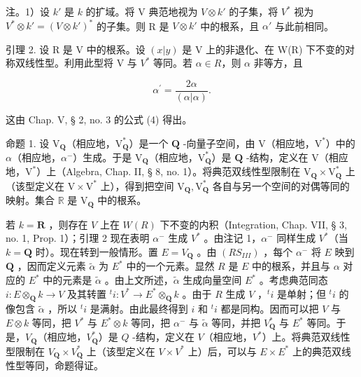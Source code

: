注。1）设 \(k'\) 是 \(k\) 的扩域。将 V 典范地视为 \(V \otimes k'\) 的子集，将 \(V^*\) 视为 \(V^* \otimes k' = (V \otimes k')^*\) 的子集。则 R 是 \(V \otimes k'\) 中的根系，且 \(\alpha'\) 与此前相同。

引理 2. 设 R 是 V 中的根系。设 \((x|y)\) 是 V 上的非退化、在 W(R) 下不变的对称双线性型。利用此型将 V 与 \(V^{*}\) 等同。若 \(\alpha \in R\)，则 \(\alpha\) 非等方，且

\[
\alpha^ {\prime} = \frac {2 \alpha}{(\alpha | \alpha)}.
\]

这由 Chap. V, § 2, no. 3 的公式 (4) 得出。

命题 1. 设 \(\mathrm{V}_{\mathbf{Q}}\)（相应地，\(\mathrm{V}_{\mathbf{Q}}^{*}\)）是一个 \(\mathbf{Q}\) -向量子空间，由 \(\mathrm{V}\)（相应地，\(\mathrm{V}^{*}\)）中的 \(\alpha\)（相应地，\(\alpha^{-}\)）生成。于是 \(\mathrm{V}_{\mathbf{Q}}\)（相应地，\(\mathrm{V}_{\mathbf{Q}}^{*}\)）是 \(\mathbf{Q}\) -结构，定义在 \(\mathrm{V}\)（相应地，\(\mathrm{V}^{*}\)）上（Algebra, Chap. II, § 8, no. 1）。将典范双线性型限制在 \(\mathrm{V}_{\mathbf{Q}} \times \mathrm{V}_{\mathbf{Q}}^{*}\) 上（该型定义在 \(\mathrm{V} \times \mathrm{V}^{*}\) 上），得到把空间 \(\mathrm{V}_{\mathbf{Q}}, \mathrm{V}_{\mathbf{Q}}^{*}\) 各自与另一个空间的对偶等同的映射。集合 \(\mathbb{R}\) 是 \(\mathrm{V}_{\mathbf{Q}}\) 中的根系。

若 \(k = \mathbf{R}\) ，则存在 \(V\) 上在 \(W(R)\) 下不变的内积（Integration, Chap. VII, § 3, no. 1, Prop. 1）；引理 2 现在表明 \(\alpha^{-}\) 生成 \(V^{*}\) 。由注记 1，\(\alpha^{-}\) 同样生成 \(V^{*}\)（当 \(k = \mathbf{Q}\) 时）。现在转到一般情形。置 \(E = V_{\mathbf{Q}}\) 。由 \((RS_{III})\) ，每个 \(\alpha^{-}\) 将 \(E\) 映到 \(\mathbf{Q}\) ，因而定义元素 \(\tilde{\alpha}\) 为 \(E^{*}\) 中的一个元素。显然 \(R\) 是 \(E\) 中的根系，并且与 \(\alpha\) 对应的 \(E^{*}\) 中的元素是 \(\tilde{\alpha}\) 。由上文所述，\(\tilde{\alpha}\) 生成向量空间 \(E^{*}\) 。考虑典范同态 \(i: E \otimes_{\mathbf{Q}} k \to V\) 及其转置 \({}^{t}i: V^{*} \to E^{*} \otimes_{\mathbf{Q}} k\) 。由于 \(R\) 生成 \(V\) ，\({}^{t}i\) 是单射；但 \({}^{t}i\) 的像包含 \(\tilde{\alpha}\) ，所以 \({}^{t}i\) 是满射。由此最终得到 \(i\) 和 \({}^{t}i\) 都是同构。因而可以把 \(V\) 与 \(E \otimes k\) 等同，把 \(V^{*}\) 与 \(E^{*} \otimes k\) 等同，把 \(\alpha^{-}\) 与 \(\tilde{\alpha}\) 等同，并把 \(V_{\mathbf{Q}}^{*}\) 与 \(E^{*}\) 等同。于是，\(V_{\mathbf{Q}}\)（相应地，\(V_{\mathbf{Q}}^{*}\)）是 \(Q\) -结构，定义在 \(V\)（相应地，\(V^{*}\)）上。将典范双线性型限制在 \(V_{\mathbf{Q}} \times V_{\mathbf{Q}}^{*}\) 上（该型定义在 \(V \times V^{*}\) 上）后，可以与 \(E \times E^{*}\) 上的典范双线性型等同，命题得证。

